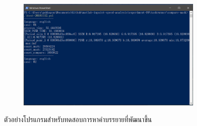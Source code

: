 \begin{figure}[H]
    \centering
    \begin{subfigure}{0.8\linewidth}
        \centering
        \includegraphics[width=1\linewidth]{image/software_appendix/lab_find.png}
    \end{subfigure}
    \caption{ตัวอย่างโปรแกรมสำหรับทดสอบการหาคำบรรยายที่พัฒนาขึ้น}
\end{figure}